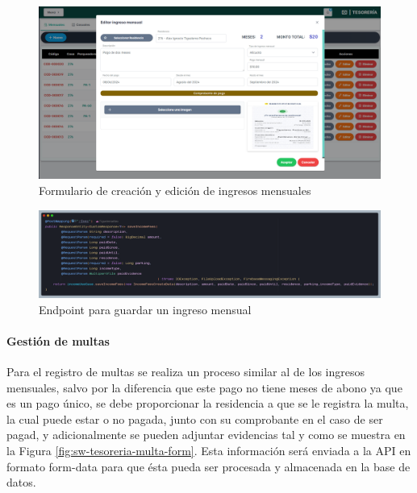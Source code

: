 \begin{figure}[H]
    \centering
    \includegraphics[width=1\textwidth]{resources/images/sw-tesoreria-mensual-form}
    \caption{Formulario de creación y edición de ingresos mensuales}
    \label{fig:sw-tesoreria-mensual-form}
\end{figure}

\begin{figure}[H]
    \centering
    \includegraphics[width=1\textwidth]{resources/images/api-mensual-save}
    \caption{Endpoint para guardar un ingreso mensual}
    \label{fig:api-tesoreria-mensual-save}
\end{figure}


\paragraph{Gestión de multas}

Para el registro de multas se realiza un proceso similar al de los ingresos mensuales, salvo por la diferencia que este pago no tiene meses de abono ya que es un pago único, se debe proporcionar la residencia a que se le registra la multa, la cual puede estar o no pagada, junto con su comprobante en el caso de ser pagad, y adicionalmente se pueden adjuntar evidencias tal y como se muestra en la Figura \ref{fig:sw-tesoreria-multa-form}.
Esta información será enviada a la API en formato form-data para que ésta pueda ser procesada y almacenada en la base de datos.


